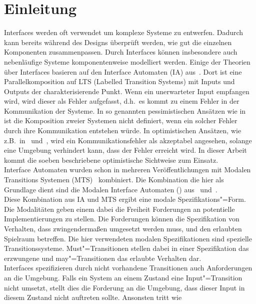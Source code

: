 \chapter*{Einleitung}

Interfaces werden oft verwendet um komplexe Systeme zu entwerfen. Dadurch kann
bereits während des Designs überprüft werden, wie gut die einzelnen Komponenten
zusammenpassen. Durch Interfaces können insbesondere auch nebenläufige
Systeme komponentenweise modelliert werden. Einige der Theorien über Interfaces
basieren auf den Interface Automaten (IA) aus~\cite{Alfaro2004}. Dort ist eine
Parallelkomposition auf LTS (Labelled Transition Systems) mit Inputs und
Outputs der charakterisierende Punkt. Wenn ein unerwarteter Input empfangen
wird, wird dieser als Fehler aufgefasst, d.h.\ es kommt zu einem Fehler in der
Kommunikation der Systeme. In so genannten pessimistischen Ansätzen wie
in~\cite{Bauer2010} ist die Komposition zweier Systemen nicht
definiert, wenn ein solcher Fehler durch ihre Kommunikation entstehen würde. In
optimistischen Ansätzen, wie z.B.\ in~\cite{Luttgen2013MIA1}
und~\cite{Vogler2016MIA3}, wird ein Kommunikationsfehler als akzeptabel
angesehen, solange eine Umgebung verhindert kann, dass der Fehler
erreicht wird. In dieser Arbeit kommt die soeben beschriebene optimistische
Sichtweise zum Einsatz.\\
Interface Automaten wurden schon in mehreren Veröffentlichungen mit Modalen
Transitions Systemen (MTS)~\cite{Larsen1989} kombiniert. Die Kombination die
hier als Grundlage dient sind die Modalen Interface Automaten (\MIA{})
aus~\cite{Luttgen2013MIA1} und~\cite{Vogler2016MIA3}.\\
Diese Kombination aus IA und MTS ergibt eine modale Spezifikations"=Form. Die
Modalitäten geben einem dabei die Freiheit Forderungen an potentielle
Implementierungen zu stellen. Die Forderungen können die Spezifikation von
Verhalten, dass zwingendermaßen umgesetzt werden muss, und den erlaubten
Spielraum betreffen. Die hier verwendeten modalen Spezifikationen sind
spezielle Transitionssysteme. Must"=Transitionen stellen dabei in einer
Spezifikation das erzwungene und may"=Transitionen das erlaubte Verhalten
dar.\\
Interfaces spezifizieren durch nicht vorhandene Transitionen auch
Anforderungen an die Umgebung. Falls ein System an einem Zustand eine
Input"=Transition nicht umsetzt, stellt dies die Forderung an die Umgebung,
dass dieser Input in diesem Zustand nicht auftreten sollte. Ansonsten tritt wie
